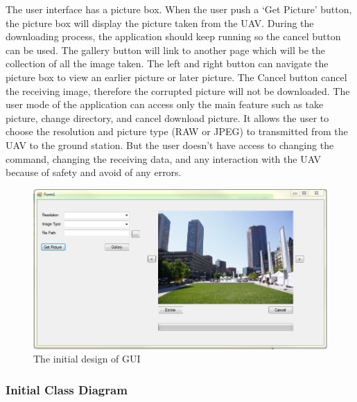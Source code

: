 \documentclass[oneside]{ecsgdp}         %
\begin{document}
The user interface has a picture box. When the user push a ‘Get Picture’ button, the picture box will display the picture taken from the UAV. During the downloading process, the application should keep running so the cancel button can be used. The gallery button will link to another page which will be the collection of all the image taken. The left and right button can navigate the picture box to view an earlier picture or later picture. The Cancel button cancel the receiving image, therefore the corrupted picture will not be downloaded. The user mode of the application can access only the main feature such as take picture, change directory, and cancel download picture.  It allows the user to choose the resolution and picture type (RAW or JPEG) to transmitted from the UAV to the ground station. But the user doesn't have access to changing the command, changing the receiving data, and any interaction with the UAV because of safety and avoid of any errors. 
\begin{figure}[!hbtp]
\begin{center}
\includegraphics[scale=0.7]{initialGUI.png} 
\end{center}
\caption{The initial design of GUI\label{ini_GUI}}
\end{figure}

\subsubsection{Initial Class Diagram}
\end{document}
